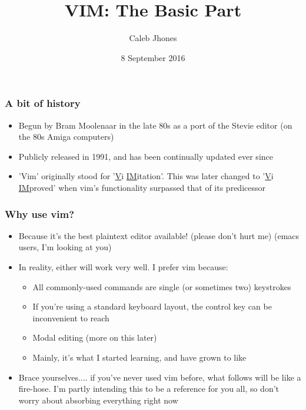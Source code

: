 \documentclass{beamer}
\title{VIM: The Basic Part}
\author{Caleb Jhones}
\date{8 September 2016}
\begin{document}
\begin{frame}
    \maketitle
\end{frame}

\begin{frame}
    \frametitle{A bit of history}
    \pause
    \begin{itemize}
        \item Begun by Bram Moolenaar in the late 80s as a port of the Stevie editor (on the 80s Amiga computers)
        \item Publicly released in 1991, and has been continually updated ever since
        \item 'Vim' originally stood for '\underline{V}i \underline{IM}itation'. This was later changed to '\underline{V}i \underline{IM}proved' when vim's functionality surpassed that of its predicessor
    \end{itemize}
\end{frame}

\begin{frame}
    \frametitle{Why use vim?}
    \pause
    \begin{itemize}
        \item Because it's the best plaintext editor available!
        \pause (please don't hurt me) \pause (emacs users, I'm looking at you)
        \pause
        \item In reality, either will work very well. I prefer vim because:
        \pause
        \begin{itemize}
            \item All commonly-used commands are single (or sometimes two) keystrokes
            \pause
            \item If you're using a standard keyboard layout, the control key can be inconvenient to reach
            \pause
            \item Modal editing (more on this later)
            \pause
            \item Mainly, it's what I started learning, and have grown to like
        \end{itemize}
        \pause
        \item Brace yourselves.... if you've never used vim before, what follows will be like a fire-hose. I'm partly intending this to be a reference for you all, so don't worry about absorbing everything right now
    \end{itemize}
\end{frame}
\end{document}
